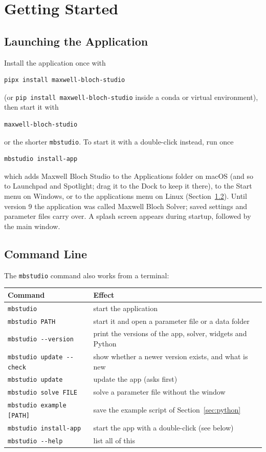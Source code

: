 \documentclass[12pt,a4paper]{article}
\begin{document}
\section{Getting Started}

\subsection{Launching the Application}

Install the application once with
\begin{verbatim}
pipx install maxwell-bloch-studio
\end{verbatim}
(or \texttt{pip install maxwell-bloch-studio} inside a conda or virtual environment),
then start it with
\begin{verbatim}
maxwell-bloch-studio
\end{verbatim}
or the shorter \texttt{mbstudio}. To start it with a double-click instead, run once
\begin{verbatim}
mbstudio install-app
\end{verbatim}
which adds Maxwell Bloch Studio to the Applications folder on macOS (and so to Launchpad and
Spotlight; drag it to the Dock to keep it there), to the Start menu on Windows, or to the
applications menu on Linux (Section~\ref{sec:cli}). Until version 9 the application was called
Maxwell Bloch Solver; saved settings and parameter files carry over.
A splash screen appears during startup, followed by the main window.

\subsection{Command Line}\label{sec:cli}

The \texttt{mbstudio} command also works from a terminal:
\begin{center}
\begin{tabular}{@{}ll@{}}
  \toprule
  Command & Effect \\
  \midrule
  \texttt{mbstudio} & start the application \\
  \texttt{mbstudio PATH} & start it and open a parameter file or a data folder \\
  \texttt{mbstudio -{}-version} & print the versions of the app, solver, widgets and Python \\
  \texttt{mbstudio update -{}-check} & show whether a newer version exists, and what is new \\
  \texttt{mbstudio update} & update the app (asks first) \\
  \texttt{mbstudio solve FILE} & solve a parameter file without the window \\
  \texttt{mbstudio example [PATH]} & save the example script of Section~\ref{sec:python} \\
  \texttt{mbstudio install-app} & start the app with a double-click (see below) \\
  \texttt{mbstudio -{}-help} & list all of this \\
  \bottomrule
\end{tabular}
\end{center}
\end{document}
